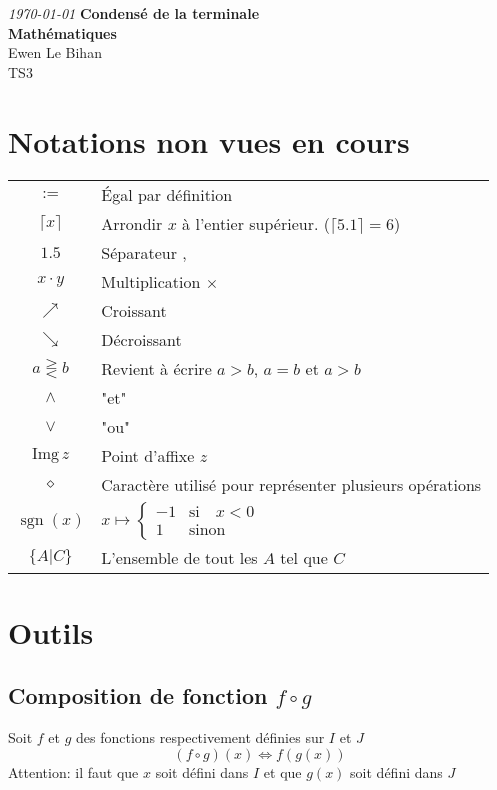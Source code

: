 \documentclass{article}
\newcommand{\img}{\text{Img}\,}
\newcommand{\placeholder}{\diamond}
\begin{document}
\begin{titlepage}
\begin{center}
\textit{\today}
\vfill
\textbf{\LARGE{Condensé de la terminale}\\\Large{Mathématiques}}\\
\vfill
\large{Ewen Le Bihan\\TS3}
\end{center}
\end{titlepage}
\section*{Notations non vues en cours}
\begin{tabular}{c|l}
	$:=$ & Égal par définition\\
	$\lceil x \rceil$ & Arrondir $x$ à l'entier supérieur. ($\lceil 5.1 \rceil = 6$)\\
	$1.5$ & Séparateur ,\\
	$x\cdot y$ & Multiplication $\times$\\
	$\nearrow$ & Croissant\\
	$\searrow$ & Décroissant \\
	$a \gtreqless b$ & Revient à écrire $a > b$, $a = b$ et $a > b$ \\
	$\land$ & "et"\\
	$\lor$ & "ou"\\
	$\img z$ & Point d'affixe $z$\\
	$\placeholder$ & Caractère utilisé pour représenter plusieurs opérations\\
	$\operatorname{sgn}(x)$ & $x \mapsto \begin{cases}
		-1 &\text{si}\quad x < 0 \\
		1 &\text{sinon}
	\end{cases}$ \\
		$\{A | C\}$ & L'ensemble de tout les $A$ tel que $C$
\end{tabular}
\pagestyle{empty}
\newpage
\tableofcontents
\pagestyle{empty}
\newpage

\setcounter{section}{-1}

\section{Outils}
\subsection{Composition de fonction $f \circ g$}
Soit $f$ et $g$ des fonctions respectivement définies sur $I$ et $J$
\[(f \circ g)(x) \iff f(g(x))\]
Attention: il faut que $x$ soit défini dans $I$ et que $g(x)$ soit défini dans $J$\\\\
\end{document}
